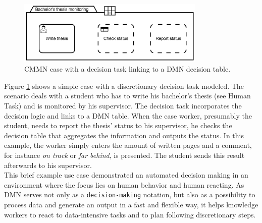 \begin{figure}
\centering
\includegraphics[width=0.8\textwidth]{../figures/chapter_combinations/CMMN_thesis_decision_task.png} 
\caption{CMMN case with a decision task linking to a DMN decision table.}
\label{fig:CMMN_with_Decision_task}
\end{figure}

Figure \ref{fig:CMMN_with_Decision_task} shows a simple case with a discretionary decision task modeled. The scenario deals with a student who has to write his bachelor's thesis (see Human Task) and is monitored by his supervisor. The decision task incorporates the decision logic and links to a DMN table. When the case worker, presumably the student, needs to report the thesis' status to his supervisor, he checks the decision table that aggregates the information and outputs the status. In this example, the worker simply enters the amount of written pages and a comment, for instance \textit{on track} or \textit{far behind}, is presented. The student sends this result afterwards to his supervisor.\\ 
This brief example use case demonstrated an automated decision making in an environment where the focus lies on human behavior and human reacting. As DMN serves not only as a \texttt{decision-making} notation, but also as a possibility to process data and generate an output in a fast and flexible way, it helps knowledge workers to react to data-intensive tasks and to plan following discretionary steps. 


